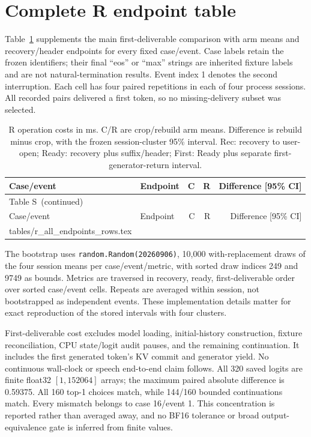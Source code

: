 \documentclass[12pt]{article}
\makeatletter
\newcommand{\tableinput}[1]{\@@input #1 }
\renewcommand{\thetable}{S\arabic{table}}
\makeatother
\begin{document}
\section{Complete R endpoint table}
\label{sec:s-r}

Table~\ref{tab:s-r} supplements the main first-deliverable comparison with arm means and recovery/header endpoints for every fixed case/event. Case labels retain the frozen identifiers; their final ``eos'' or ``max'' strings are inherited fixture labels and are not natural-termination results. Event index 1 denotes the second interruption. Each cell has four paired repetitions in each of four process sessions. All recorded pairs delivered a first token, so no missing-delivery subset was selected.

\begingroup\small
\setlength{\LTpre}{6pt}
\setlength{\LTpost}{6pt}
\begin{longtable}{@{}llrrr@{}}
\caption{R operation costs in ms. C/R are crop/rebuild arm means. Difference is rebuild minus crop, with the frozen session-cluster 95\% interval. Rec: recovery to user-open; Ready: recovery plus suffix/header; First: Ready plus separate first-generator-return interval.}\label{tab:s-r}\\
\toprule
Case/event & Endpoint & C & R & Difference [95\% CI] \\
\midrule\endfirsthead
\multicolumn{5}{l}{Table \thetable\ (continued)}\\
\toprule
Case/event & Endpoint & C & R & Difference [95\% CI] \\
\midrule\endhead
\bottomrule\endfoot
\tableinput{tables/r_all_endpoints_rows.tex}
\end{longtable}
\endgroup

The bootstrap uses \texttt{random.Random(20260906)}, 10,000 with-replacement draws of the four session means per case/event/metric, with sorted draw indices 249 and 9749 as bounds. Metrics are traversed in recovery, ready, first-deliverable order over sorted case/event cells. Repeats are averaged within session, not bootstrapped as independent events. These implementation details matter for exact reproduction of the stored intervals with four clusters.

First-deliverable cost excludes model loading, initial-history construction, fixture reconciliation, CPU state/logit audit pauses, and the remaining continuation. It includes the first generated token's KV commit and generator yield. No continuous wall-clock or speech end-to-end claim follows. All 320 saved logits are finite float32 $[1,152064]$ arrays; the maximum paired absolute difference is 0.59375. All 160 top-1 choices match, while 144/160 bounded continuations match. Every mismatch belongs to case 16/event 1. This concentration is reported rather than averaged away, and no BF16 tolerance or broad output-equivalence gate is inferred from finite values.

\begingroup
\setlength{\bibsep}{0pt}


\endgroup
\end{document}
